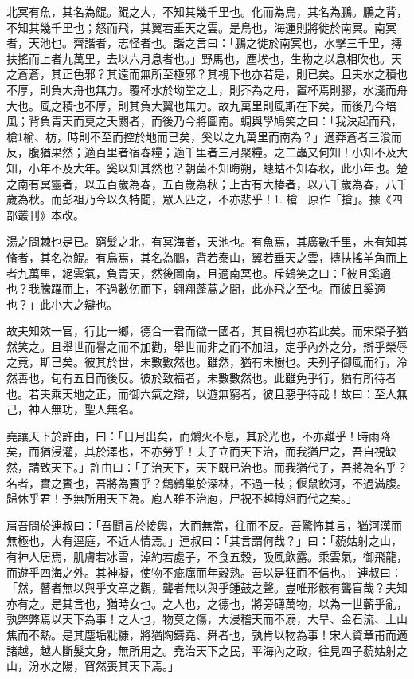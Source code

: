 
\begin{pinyinscope}
北冥有魚，其名為鯤。鯤之大，不知其幾千里也。化而為鳥，其名為鵬。鵬之背，不知其幾千里也；怒而飛，其翼若垂天之雲。是鳥也，海運則將徙於南冥。南冥者，天池也。齊諧者，志怪者也。諧之言曰：「鵬之徙於南冥也，水擊三千里，摶扶搖而上者九萬里，去以六月息者也。」野馬也，塵埃也，生物之以息相吹也。天之蒼蒼，其正色邪？其遠而無所至極邪？其視下也亦若是，則已矣。且夫水之積也不厚，則負大舟也無力。覆杯水於坳堂之上，則芥為之舟，置杯焉則膠，水淺而舟大也。風之積也不厚，則其負大翼也無力。故九萬里則風斯在下矣，而後乃今培風；背負青天而莫之夭閼者，而後乃今將圖南。蜩與學鳩笑之曰：「我決起而飛，槍1榆、枋，時則不至而控於地而已矣，奚以之九萬里而南為？」適莽蒼者三湌而反，腹猶果然；適百里者宿舂糧；適千里者三月聚糧。之二蟲又何知！小知不及大知，小年不及大年。奚以知其然也？朝菌不知晦朔，蟪蛄不知春秋，此小年也。楚之南有冥靈者，以五百歲為春，五百歲為秋；上古有大椿者，以八千歲為春，八千歲為秋。而彭祖乃今以久特聞，眾人匹之，不亦悲乎！1. 槍 : 原作「搶」。據《四部叢刊》本改。

湯之問棘也是已。窮髮之北，有冥海者，天池也。有魚焉，其廣數千里，未有知其脩者，其名為鯤。有鳥焉，其名為鵬，背若泰山，翼若垂天之雲，摶扶搖羊角而上者九萬里，絕雲氣，負青天，然後圖南，且適南冥也。斥鴳笑之曰：「彼且奚適也？我騰躍而上，不過數仞而下，翱翔蓬蒿之間，此亦飛之至也。而彼且奚適也？」此小大之辯也。

故夫知效一官，行比一鄉，德合一君而徵一國者，其自視也亦若此矣。而宋榮子猶然笑之。且舉世而譽之而不加勸，舉世而非之而不加沮，定乎內外之分，辯乎榮辱之竟，斯已矣。彼其於世，未數數然也。雖然，猶有未樹也。夫列子御風而行，泠然善也，旬有五日而後反。彼於致福者，未數數然也。此雖免乎行，猶有所待者也。若夫乘天地之正，而御六氣之辯，以遊無窮者，彼且惡乎待哉！故曰：至人無己，神人無功，聖人無名。

堯讓天下於許由，曰：「日月出矣，而爝火不息，其於光也，不亦難乎！時雨降矣，而猶浸灌，其於澤也，不亦勞乎！夫子立而天下治，而我猶尸之，吾自視缺然，請致天下。」許由曰：「子治天下，天下既已治也。而我猶代子，吾將為名乎？名者，實之賓也，吾將為賓乎？鷦鷯巢於深林，不過一枝；偃鼠飲河，不過滿腹。歸休乎君！予無所用天下為。庖人雖不治庖，尸祝不越樽俎而代之矣。」

肩吾問於連叔曰：「吾聞言於接輿，大而無當，往而不反。吾驚怖其言，猶河漢而無極也，大有逕庭，不近人情焉。」連叔曰：「其言謂何哉？」曰：「藐姑射之山，有神人居焉，肌膚若冰雪，淖約若處子，不食五穀，吸風飲露。乘雲氣，御飛龍，而遊乎四海之外。其神凝，使物不疵癘而年穀熟。吾以是狂而不信也。」連叔曰：「然，瞽者無以與乎文章之觀，聾者無以與乎鍾鼓之聲。豈唯形骸有聾盲哉？夫知亦有之。是其言也，猶時女也。之人也，之德也，將旁礡萬物，以為一世蘄乎亂，孰弊弊焉以天下為事！之人也，物莫之傷，大浸稽天而不溺，大旱、金石流、土山焦而不熱。是其塵垢粃糠，將猶陶鑄堯、舜者也，孰肯以物為事！宋人資章甫而適諸越，越人斷髮文身，無所用之。堯治天下之民，平海內之政，往見四子藐姑射之山，汾水之陽，窅然喪其天下焉。」


\end{pinyinscope}
